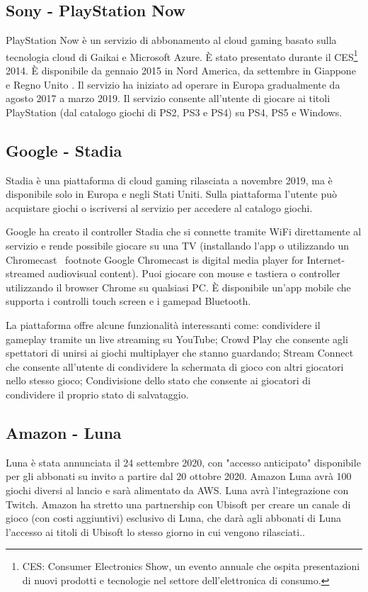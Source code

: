 \subsection{Sony - PlayStation Now}
PlayStation Now è un servizio di abbonamento al cloud gaming basato sulla tecnologia cloud di Gaikai e Microsoft Azure. È stato presentato durante il CES\footnote{CES: Consumer Electronics Show, un evento annuale che ospita presentazioni di nuovi prodotti e tecnologie nel settore dell'elettronica di consumo.} 2014. È disponibile da gennaio 2015 in Nord America, da settembre in Giappone e Regno Unito . Il servizio ha iniziato ad operare in Europa gradualmente da agosto 2017 a marzo 2019. Il servizio consente all'utente di giocare ai titoli PlayStation (dal catalogo giochi di PS2, PS3 e PS4) su PS4, PS5 e Windows\cite{PlayStation_Now}.

\subsection{Google - Stadia}
Stadia è una piattaforma di cloud gaming rilasciata a novembre 2019, ma è disponibile solo in Europa e negli Stati Uniti. Sulla piattaforma l'utente può acquistare giochi o iscriversi al servizio per accedere al catalogo giochi.

Google ha creato il controller Stadia che si connette tramite WiFi direttamente al servizio e rende possibile giocare su una TV (installando l'app o utilizzando un Chromecast \ footnote {Google Chromecast is digital media player for Internet-streamed audiovisual content}). Puoi giocare con mouse e tastiera o controller utilizzando il browser Chrome su qualsiasi PC. È disponibile un'app mobile che supporta i controlli touch screen e i gamepad Bluetooth.

La piattaforma offre alcune funzionalità interessanti come: condividere il gameplay tramite un live streaming su YouTube; Crowd Play che consente agli spettatori di unirsi ai giochi multiplayer che stanno guardando; Stream Connect che consente all'utente di condividere la schermata di gioco con altri giocatori nello stesso gioco; Condivisione dello stato che consente ai giocatori di condividere il proprio stato di salvataggio\cite{Google_Stadia}.

\subsection{Amazon - Luna}
Luna è stata annunciata il 24 settembre 2020, con "accesso anticipato" disponibile per gli abbonati su invito a partire dal 20 ottobre 2020. Amazon Luna avrà 100 giochi diversi al lancio e sarà alimentato da AWS. Luna avrà l'integrazione con Twitch. Amazon ha stretto una partnership con Ubisoft per creare un canale di gioco (con costi aggiuntivi) esclusivo di Luna, che darà agli abbonati di Luna l'accesso ai titoli di Ubisoft lo stesso giorno in cui vengono rilasciati.\cite{Amazon_Luna}.

